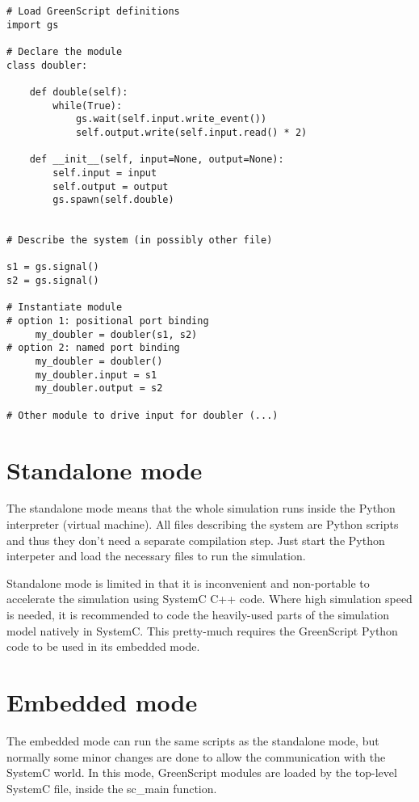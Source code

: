 \documentclass[12pt,oneside]{gsbook}
\begin{document}
\begin{lstlisting}
# Load GreenScript definitions
import gs

# Declare the module
class doubler:

    def double(self):
        while(True):
            gs.wait(self.input.write_event())
            self.output.write(self.input.read() * 2)

    def __init__(self, input=None, output=None):
        self.input = input
        self.output = output
        gs.spawn(self.double)


# Describe the system (in possibly other file)

s1 = gs.signal()
s2 = gs.signal()

# Instantiate module
# option 1: positional port binding
     my_doubler = doubler(s1, s2)
# option 2: named port binding
     my_doubler = doubler()
     my_doubler.input = s1
     my_doubler.output = s2

# Other module to drive input for doubler (...)
\end{lstlisting}


\section{Standalone mode}

The standalone mode means that the whole simulation runs inside the
Python interpreter (virtual machine). All files describing the system are
Python scripts and thus they don't need a separate compilation step.
Just start the Python interpeter and load the necessary files to run
the simulation.

Standalone mode is limited in that it is inconvenient and non-portable to
accelerate the simulation using SystemC C++ code.  Where high simulation
speed is needed, it is recommended to code the heavily-used parts of
the simulation model natively in SystemC.  This pretty-much requires the
GreenScript Python code to be used in its embedded mode.

\section{Embedded mode}

The embedded mode can run the same scripts as the standalone mode,
but normally some minor changes are done to allow the communication
with the SystemC world. In this mode, GreenScript modules are loaded
by the top-level SystemC file, inside the sc\_main function.
\end{document}

